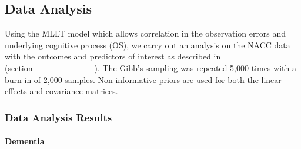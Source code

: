 \documentclass[
]{article}
\author{}
\date{\vspace{-2.5em}}
\begin{document}
\hypertarget{data-analysis}{%
\subsection{Data Analysis}\label{data-analysis}}

Using the MLLT model which allows correlation in the observation errors and underlying cognitive process (OS), we carry out an analysis on the NACC data with the outcomes and predictors of interest as described in (section\_\_\_\_\_\_\_\_\_\_). The Gibb's sampling was repeated 5,000 times with a burn-in of 2,000 samples. Non-informative priors are used for both the linear effects and covariance matrices.

\hypertarget{data-analysis-results}{%
\subsubsection{Data Analysis Results}\label{data-analysis-results}}

\hypertarget{dementia}{%
\paragraph{Dementia}\label{dementia}}

\begingroup\fontsize{7}{9}\selectfont
\end{document}
